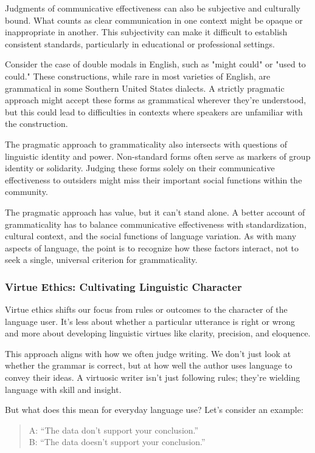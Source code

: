 Judgments of communicative effectiveness can also be subjective and culturally bound. What counts as clear communication in one context might be opaque or inappropriate in another. This subjectivity can make it difficult to establish consistent standards, particularly in educational or professional settings.

Consider the case of double modals in English, such as "might could" or "used to could." These constructions, while rare in most varieties of English, are grammatical in some Southern United States dialects. A strictly pragmatic approach might accept these forms as grammatical wherever they're understood, but this could lead to difficulties in contexts where speakers are unfamiliar with the construction.

The pragmatic approach to grammaticality also intersects with questions of linguistic identity and power. Non-standard forms often serve as markers of group identity or solidarity. Judging these forms solely on their communicative effectiveness to outsiders might miss their important social functions within the community.

The pragmatic approach has value, but it can't stand alone. A better account of grammaticality has to balance communicative effectiveness with standardization, cultural context, and the social functions of language variation. As with many aspects of language, the point is to recognize how these factors interact, not to seek a single, universal criterion for grammaticality.

\subsubsection{Virtue Ethics: Cultivating Linguistic Character}

Virtue ethics shifts our focus from rules or outcomes to the character of the language user. It's less about whether a particular utterance is right or wrong and more about developing linguistic virtues like clarity, precision, and eloquence.

This approach aligns with how we often judge writing. We don't just look at whether the grammar is correct, but at how well the author uses language to convey their ideas. A virtuosic writer isn't just following rules; they're wielding language with skill and insight.

But what does this mean for everyday language use? Let's consider an example:

\begin{quote}
A: ``The data don't support your conclusion.''\\
B: ``The data doesn't support your conclusion.''
\end{quote}


